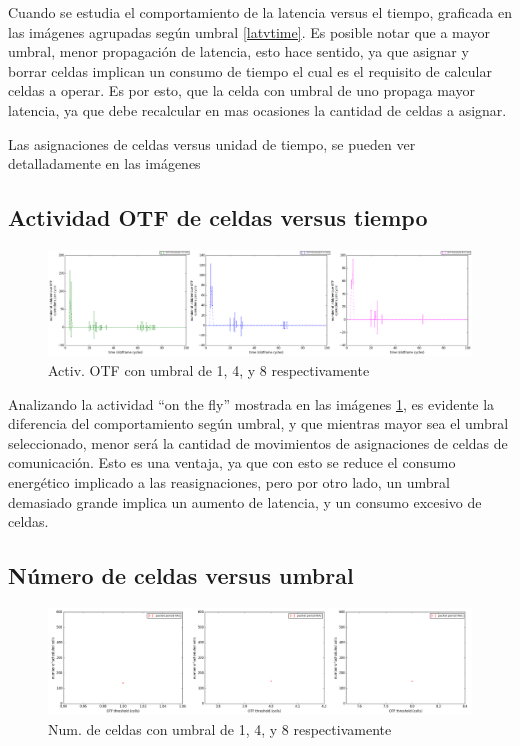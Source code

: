     Cuando se estudia el comportamiento de la latencia versus el tiempo, graficada en las imágenes agrupadas según umbral \ref{latvtime}. Es posible notar que a mayor umbral, menor propagación de latencia, esto hace sentido, ya que asignar y borrar celdas implican un consumo de tiempo el cual es el requisito de calcular celdas a operar. Es por esto, que la celda con umbral de uno propaga mayor latencia, ya que debe recalcular en mas ocasiones la cantidad de celdas a asignar.
    
    Las asignaciones de celdas versus unidad de tiempo, se pueden ver detalladamente en las imágenes
    
\subsection{Actividad OTF de celdas versus tiempo}

        \begin{figure}[h]
        \graphicspath{ {imagenes/agrupadas/} }
        \centering
        \includegraphics[width=1.0\textwidth]{otfactvstime.png}
        \caption{Activ. OTF con umbral de 1, 4, y 8 respectivamente}
        \label{actotfvtime}
        \end{figure}


    Analizando la actividad ``on the fly'' mostrada en las imágenes \ref{actotfvtime}, es evidente la diferencia del comportamiento según umbral, y que mientras mayor sea el umbral seleccionado, menor será la cantidad de movimientos de asignaciones de celdas de comunicación. Esto es una ventaja, ya que con esto se reduce el consumo energético implicado a las reasignaciones, pero por otro lado, un umbral demasiado grande implica un aumento de latencia, y un consumo excesivo de celdas.
    


\subsection{Número de celdas versus umbral}

        \begin{figure}[h]
        \graphicspath{ {imagenes/agrupadas/} }
        \centering
        \includegraphics[width=1.0\textwidth]{numcelvsthre.png}
        \caption{Num. de celdas con umbral de 1, 4, y 8 respectivamente}
        \label{numcelvthr}
        \end{figure}

